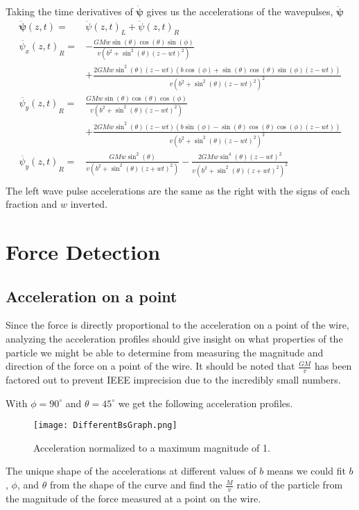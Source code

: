 \documentclass{report}
\begin{document}
Taking the time derivatives of $\mathbf{\dot{\psi}}$ gives us the accelerations of the wavepulses, $\mathbf{\ddot \psi}$
\begin{align}
    \mathbf{\ddot\psi} (z, t) =& {\ddot{\psi} (z, t)}_L + {\ddot{\psi} (z, t)}_R\label{acceleration_pulse}\\
    \nonumber {\ddot{\psi_x} (z, t)}_R =& -\frac{G M w \sin (\theta ) \cos (\theta ) \sin (\phi )}{v \left(b^2+\sin ^2(\theta ) {(z - w t)}^2\right) }\\
    & +\frac{2 G M w \sin ^2(\theta ) (z - w t) (b \cos (\phi )+\sin (\theta ) \cos (\theta ) \sin (\phi ) (z - w t))}{v {\left(b^2+\sin ^2(\theta ) {(z - w t)}^2\right)}^2}\\
    \nonumber {\ddot{\psi_y} (z, t)}_R =& \frac{G M w \sin (\theta ) \cos (\theta ) \cos (\phi )}{v \left(b^2+\sin ^2(\theta ) {(z - w t)}^2\right)}\\
    & +\frac{2 G M w \sin ^2(\theta ) (z - w t) (b \sin (\phi )-\sin (\theta ) \cos (\theta ) \cos (\phi ) (z - w t))}{v {\left(b^2+\sin ^2(\theta ) {(z - w t)}^2\right)}^2} \\
    \nonumber {\ddot{\psi_y} (z, t)}_R =& \frac{G M w \sin ^2(\theta )}{v \left(b^2+\sin ^2(\theta ) {(z + w t)}^2\right)} - \frac{2 G M w \sin ^4(\theta ) {(z - w t)}^2}{v {\left(b^2+\sin ^2(\theta ) {(z + w t)}^2\right)}^2}\\
\end{align} 
The left wave pulse accelerations are the same as the right with the signs of each fraction and $w$ inverted. 
\chapter*{Force Detection}
\section*{Acceleration on a point}
Since the force is directly proportional to the acceleration on a point of the wire, analyzing the acceleration profiles should give insight on what properties of the particle we might be able to determine from measuring the magnitude and direction of the force on a point of the wire. 
It should be noted that $\frac{G M}{v}$ has been factored out to prevent IEEE imprecision due to the incredibly small numbers. 

With $\phi = 90^\circ$ and $\theta = 45^\circ$ we get the following acceleration profiles. 
\begin{figure}[H]
    \texttt{[image: DifferentBsGraph.png]}
    \caption{Acceleration normalized to a maximum magnitude of 1.}\label{fig:normAcc}
\end{figure}
The unique shape of the accelerations at different values of $b$ means we could fit $b$, $\phi$, and $\theta$ from the shape of the curve and find the $\frac{M}{v}$ ratio of the particle from the magnitude of the force measured at a point on the wire.
\end{document}
